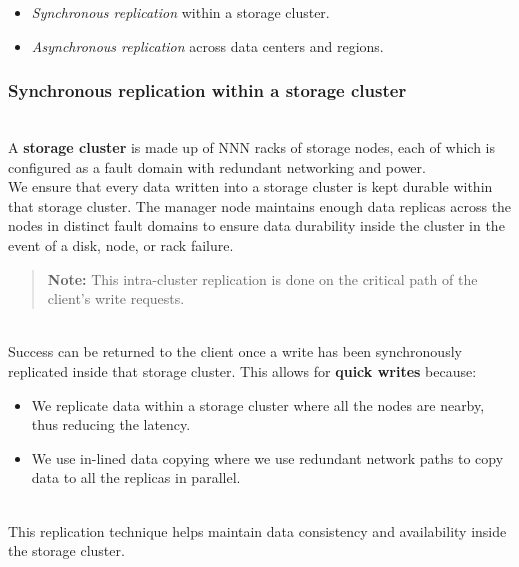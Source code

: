 \begin{itemize}
\item
\protect{}\label{RmP-lOAMJ7NlfkxkiIc63}
\emph{Synchronous replication} within a storage cluster.
\item
\protect{}\label{HCpjuru4M6x8EgC-0enek}
\emph{Asynchronous replication} across data centers and regions.
\end{itemize}

\subsubsection{Synchronous replication within a storage cluster}\label{Pn_KY_GwGxXgIxSmzHL9z}
\\
A \textbf{storage cluster} is made up of NNN racks of storage nodes, each of which is configured as a fault domain with redundant networking and power.
\\
We ensure that every data written into a storage cluster is kept durable within that storage cluster. The manager node maintains enough data replicas across the nodes in distinct fault domains to ensure data durability inside the cluster in the event of a disk, node, or rack failure.
\begin{quote}
\textbf{Note:} This intra-cluster replication is done on the critical path of the client's write requests.
\end{quote}
\\
Success can be returned to the client once a write has been synchronously replicated inside that storage cluster. This allows for \textbf{quick writes} because:

\begin{itemize}
\item
\protect{}\label{d_YozD5HkE4waV940bgG6}
We replicate data within a storage cluster where all the nodes are nearby, thus reducing the latency.
\item
\protect{}\label{zut_sfZ0HbJhcYJn0xty8}
We use in-lined data copying where we use redundant network paths to copy data to all the replicas in parallel.
\end{itemize}
\\
This replication technique helps maintain data consistency and availability inside the storage cluster.

